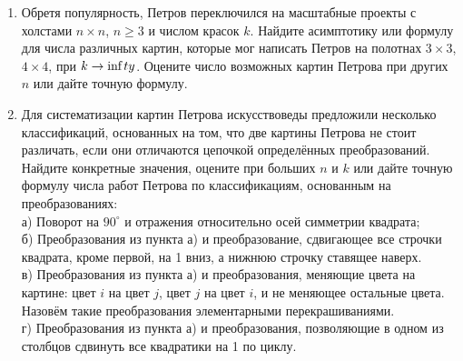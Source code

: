 \begin{enumerate}
\item Обретя популярность, Петров переключился на масштабные проекты с холстами $n\times n$, $n\geq 3$ и числом красок $k$. Найдите асимптотику или формулу для числа различных картин, которые мог написать Петров на полотнах $3\times 3$, $4\times 4$, при $k\to\text{inf\,}ty$. Оцените число возможных картин Петрова при других $n$ или дайте точную формулу.
\item Для систематизации картин Петрова искусствоведы предложили несколько классификаций, основанных на том, что две картины Петрова не стоит различать, если они отличаются цепочкой определённых преобразований. Найдите конкретные значения, оцените при больших $n$ и $k$ или дайте точную формулу числа работ Петрова по классификациям, основанным на преобразованиях: \\
а) Поворот на $90^{\circ}$ и отражения относительно осей симметрии квадрата;\\
б) Преобразования из пункта а) и преобразование, сдвигающее все строчки квадрата, кроме первой, на 1 вниз, а нижнюю строчку ставящее наверх.\\
в) Преобразования из пункта а) и преобразования, меняющие цвета на картине: цвет $i$ на цвет $j$, цвет $j$ на цвет $i$, и не меняющее остальные цвета. Назовём такие преобразования элементарными перекрашиваниями.\\
г) Преобразования из пункта а) и преобразования, позволяющие в одном из столбцов сдвинуть все квадратики на 1 по циклу. \\
\begin{figure}[h]\label{recolor}
\begin{center}
\end{center}
\end{figure}
\end{enumerate}
